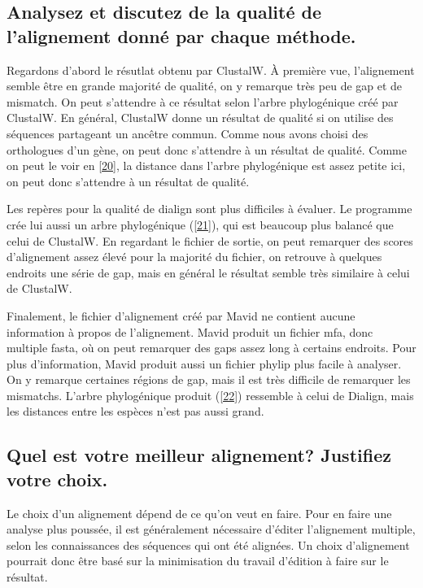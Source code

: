\documentclass[10.8pt]{article} %
\begin{document}
\subsection[Qualité des alignements]{Analysez et discutez de la qualité de l'alignement donné par chaque méthode.}

Regardons d'abord le résutlat obtenu par ClustalW. À première vue, l'alignement semble être en grande majorité de qualité,
on y remarque très peu de gap et de mismatch. On peut s'attendre à ce résultat selon l'arbre phylogénique
créé par ClustalW. En général, ClustalW donne un résultat de qualité si on utilise des séquences partageant un ancêtre commun.
Comme nous avons choisi des orthologues d'un gène, on peut donc s'attendre à un résultat de qualité. Comme on peut le voir en
\ref{20}, la distance dans l'arbre phylogénique est assez petite ici, on peut donc s'attendre à un résultat de qualité.

Les repères pour la qualité de dialign sont plus difficiles à évaluer. Le programme crée lui aussi un arbre phylogénique (\ref{21}),
qui est beaucoup plus balancé que celui de ClustalW. En regardant le fichier de sortie, on peut remarquer des scores 
d'alignement assez élevé pour la majorité du fichier, on retrouve à quelques endroits une série de gap, mais en général le résultat
semble très similaire à celui de ClustalW.

Finalement, le fichier d'alignement créé par Mavid ne contient aucune information à propos de l'alignement. Mavid produit un fichier
mfa, donc multiple fasta, où on peut remarquer des gaps assez long à certains endroits. Pour plus d'information, Mavid produit
aussi un fichier phylip plus facile à analyser. On y remarque certaines régions de gap, mais il est très difficile
de remarquer les mismatchs. L'arbre phylogénique produit (\ref{22}) ressemble à celui de Dialign, mais les distances entre les
espèces n'est pas aussi grand.

\subsection[Meilleur alignement]{Quel est votre meilleur alignement? Justifiez votre choix.}

Le choix d'un alignement dépend de ce qu'on veut en faire. Pour en faire une analyse plus poussée, il est
généralement nécessaire d'éditer l'alignement multiple, selon les connaissances des séquences qui ont été
alignées. Un choix d'alignement pourrait donc être basé sur la minimisation du travail d'édition à faire
sur le résultat.
\end{document}
